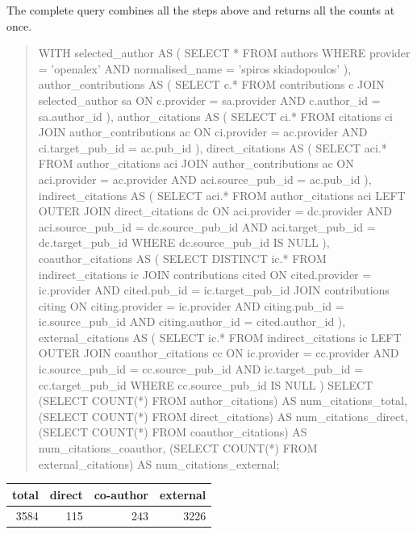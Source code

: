 The complete query combines all the steps above and returns all the counts at once.

\begin{quote}
    \begin{vercode}
WITH
selected_author AS (
    SELECT *
    FROM authors
    WHERE provider = 'openalex'
        AND normalised_name = 'spiros skiadopoulos'
),
author_contributions AS (
    SELECT c.*
    FROM contributions c
        JOIN selected_author sa
            ON c.provider = sa.provider
                AND c.author_id = sa.author_id
),
author_citations AS (
    SELECT ci.*
    FROM citations ci
        JOIN author_contributions ac
            ON ci.provider = ac.provider
                AND ci.target_pub_id = ac.pub_id
),
direct_citations AS (
    SELECT aci.*
    FROM author_citations aci
        JOIN author_contributions ac
            ON aci.provider = ac.provider
                AND aci.source_pub_id = ac.pub_id
),
indirect_citations AS (
    SELECT aci.*
    FROM author_citations aci
        LEFT OUTER JOIN direct_citations dc
            ON aci.provider = dc.provider
                AND aci.source_pub_id = dc.source_pub_id
                AND aci.target_pub_id = dc.target_pub_id
    WHERE dc.source_pub_id IS NULL
),
coauthor_citations AS (
    SELECT DISTINCT ic.*
    FROM indirect_citations ic
        JOIN contributions cited
            ON cited.provider = ic.provider
                AND cited.pub_id = ic.target_pub_id
        JOIN contributions citing
            ON citing.provider = ic.provider
                AND citing.pub_id = ic.source_pub_id
                AND citing.author_id = cited.author_id
),
external_citations AS (
    SELECT ic.*
    FROM indirect_citations ic
        LEFT OUTER JOIN coauthor_citations cc
            ON ic.provider = cc.provider
                AND ic.source_pub_id = cc.source_pub_id
                AND ic.target_pub_id = cc.target_pub_id
    WHERE cc.source_pub_id IS NULL
)
SELECT
    (SELECT COUNT(*) FROM author_citations)
        AS num_citations_total,
    (SELECT COUNT(*) FROM direct_citations)
        AS num_citations_direct,
    (SELECT COUNT(*) FROM coauthor_citations)
        AS num_citations_coauthor,
    (SELECT COUNT(*) FROM external_citations)
        AS num_citations_external;
    \end{vercode}
\end{quote}

\begin{center}
    \begin{tabular}{|r|r|r|r|}
        \hline
        total & direct & co-author & external \\
        \hline\hline
        3584 & 115 & 243 & 3226 \\
        \hline
    \end{tabular}
\end{center}

